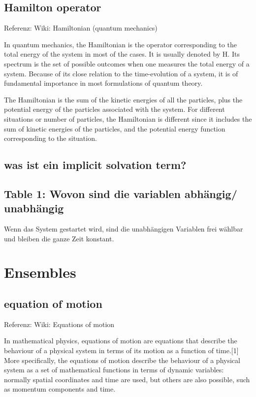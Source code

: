 \documentclass[]{article}
\begin{document}
\subsection{Hamilton operator}
Referenz: Wiki: Hamiltonian (quantum mechanics) 

In quantum mechanics, the Hamiltonian is the operator corresponding to the total energy of the system in most of the cases. It is usually denoted by H. Its spectrum is the set of possible outcomes when one measures the total energy of a system. Because of its close relation to the time-evolution of a system, it is of fundamental importance in most formulations of quantum theory.

The Hamiltonian is the sum of the kinetic energies of all the particles, plus the potential energy of the particles associated with the system. For different situations or number of particles, the Hamiltonian is different since it includes the sum of kinetic energies of the particles, and the potential energy function corresponding to the situation.

\subsection{was ist ein implicit solvation term?}

\subsection{Table 1: Wovon sind die variablen abhängig/ unabhängig}
Wenn das System gestartet wird, sind die unabhängigen Variablen frei wählbar und bleiben die ganze Zeit konstant. 

\section{Ensembles}

\subsection{equation of motion}
Referenz: Wiki: Equations of motion

In mathematical physics, equations of motion are equations that describe the behaviour of a physical system in terms of its motion as a function of time.[1] More specifically, the equations of motion describe the behaviour of a physical system as a set of mathematical functions in terms of dynamic variables: normally spatial coordinates and time are used, but others are also possible, such as momentum components and time.
\end{document}
